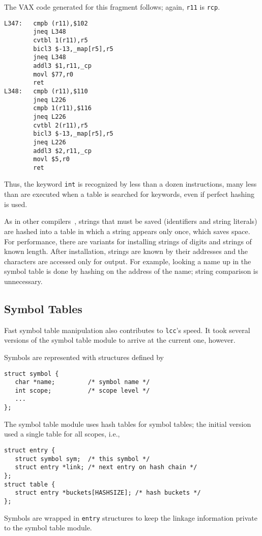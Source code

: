 The VAX code generated for this fragment follows;
again, \verb|r11| is \verb|rcp|.
\begin{verbatim}
L347:   cmpb (r11),$102
        jneq L348
        cvtbl 1(r11),r5
        bicl3 $-13,_map[r5],r5
        jneq L348
        addl3 $1,r11,_cp
        movl $77,r0
        ret
L348:   cmpb (r11),$110
        jneq L226
        cmpb 1(r11),$116
        jneq L226
        cvtbl 2(r11),r5
        bicl3 $-13,_map[r5],r5
        jneq L226
        addl3 $2,r11,_cp
        movl $5,r0
        ret
\end{verbatim}
Thus, the keyword \verb|int| is recognized by less than
a dozen instructions, many less than are executed
when a table is searched for keywords, even if perfect hashing is used.

As in other compilers~\cite{aho:sethi:ullman:86},
strings that must be saved (identifiers and string literals)
are hashed into a table in which a string appears only once,
which saves space. For performance, there are variants for installing strings of digits
and strings of known length.
After installation, strings are known by their addresses
and the characters are accessed only for output.
For example, looking a name up in the symbol table is
done by hashing on the address of the name; string comparison is unnecessary.

\subsection{Symbol Tables}

Fast symbol table manipulation also contributes to
\verb|lcc|'s speed. It took several versions
of the symbol table module to arrive at the current one, however.

Symbols are represented with structures defined by
\begin{verbatim}
struct symbol {
   char *name;         /* symbol name */
   int scope;          /* scope level */
   ...
};
\end{verbatim}
The symbol table module uses hash
tables for symbol tables; the initial version used
a single table for all scopes, i.e.,
\begin{verbatim}
struct entry {
   struct symbol sym;  /* this symbol */
   struct entry *link; /* next entry on hash chain */
};
struct table {
   struct entry *buckets[HASHSIZE]; /* hash buckets */
};
\end{verbatim}
Symbols are wrapped in \verb|entry| structures to keep
the linkage information private to the symbol table module.

